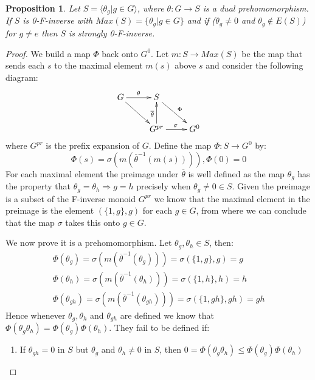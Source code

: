 \documentclass[11pt]{amsart}
\theoremstyle{plain}
\newtheorem{proposition}[theorem]{Proposition}%
\theoremstyle{definition}%
\theoremstyle{remark}%
\begin{document}
\begin{proposition}\label{Prop:Strongly}
Let $S = \langle \theta_{g} | g \in G \rangle$, where $\theta: G \rightarrow S$ is a dual prehomomorphism. If $S$ is 0-F-inverse with $Max(S) = \lbrace \theta_{g} | g \in G \rbrace$ and if  ($\theta_{g} \not = 0$ and $\theta_{g} \not \in E(S)$) for $g\not = e$ then $S$ is strongly 0-F-inverse.
\end{proposition}
\begin{proof}
We build a map $\Phi$ back onto $G^{0}$. Let $m: S \rightarrow Max(S)$ be the map that sends each $s$ to the maximal element $m(s)$ above $s$ and consider the following diagram:
\begin{equation*}
\xymatrix{
G\ar@{->}[r]^{\theta}\ar@{->}[dr]^{}  & S\ar@{->}[dr]^{\Phi}  & \\
  & G^{pr} \ar@{->}[r]^{\sigma}\ar@{->}[u]^{\overline{\theta}}  & G^{0}
}
\end{equation*}
where $G^{pr}$ is the prefix expansion of $G$. Define the map $\Phi:S \rightarrow G^{0}$ by:
\begin{equation*}
\Phi(s)=\sigma ( m ( \overline{\theta}^{-1} (m(s)))), \Phi(0)=0
\end{equation*}
For each maximal element the preimage under $\overline{\theta}$ is well defined as the map $\theta_{g}$ has the property that $\theta_{g}=\theta_{h} \Rightarrow g=h$ precisely when $\theta_{g} \not = 0 \in S$. Given the preimage is a subset of the F-inverse monoid $G^{pr}$ we know that the maximal element in the preimage is the element $(\lbrace 1,g \rbrace,g)$ for each $g \in G$, from where we can conclude that the map $\sigma$ takes this onto $g \in G$.

We now prove it is a prehomomorphism. Let $\theta_{g},\theta_{h} \in S$, then:
\begin{eqnarray*}
\Phi(\theta_{g})=\sigma ( m(\overline{\theta}^{-1}(\theta_{g}))) = \sigma ( \lbrace 1,g \rbrace, g)= g\\
\Phi(\theta_{h})=\sigma ( m(\overline{\theta}^{-1}(\theta_{h}))) = \sigma ( \lbrace 1,h \rbrace, h)= h\\
\Phi(\theta_{gh})=\sigma ( m(\overline{\theta}^{-1}(\theta_{gh}))) = \sigma ( \lbrace 1,gh \rbrace, gh)= gh
\end{eqnarray*}
Hence whenever $\theta_{g},\theta_{h}$ and $\theta_{gh}$ are defined we know that $\Phi(\theta_{g}\theta_{h})=\Phi(\theta_{g})\Phi(\theta_{h})$. They fail to be defined if:
\begin{enumerate}
\item If $\theta_{gh} = 0$ in $S$ but $\theta_{g}$ and $\theta_{h} \not = 0$ in $S$, then $0=\Phi(\theta_{g}\theta_{h})\leq \Phi(\theta_{g})\Phi(\theta_{h})$


\end{enumerate}
\end{proof}
\end{document}
